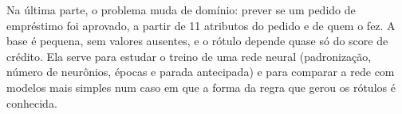 Na última parte, o problema muda de domínio: prever se um pedido de empréstimo foi aprovado, a partir de 11 atributos do pedido e de quem o fez. A base é pequena, sem valores ausentes, e o rótulo depende quase só do score de crédito. Ela serve para estudar o treino de uma rede neural (padronização, número de neurônios, épocas e parada antecipada) e para comparar a rede com modelos mais simples num caso em que a forma da regra que gerou os rótulos é conhecida.

